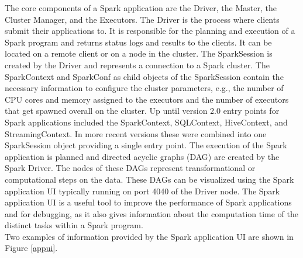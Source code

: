 \noindent The core components of a Spark application are the Driver, the Master, the Cluster Manager, and the Executors. The Driver is the process where clients submit their applications to. It is responsible for the planning and execution of a Spark program and returns status logs and results to the clients. It can be located on a remote client or on a node in the cluster. The SparkSession is created by the Driver and represents a connection to a Spark cluster. The SparkContext and SparkConf as child objects of the SparkSession contain the necessary information to configure the cluster parameters, e.g., the number of CPU cores and memory assigned to the executors and the number of executors that get spawned overall on the cluster. Up until version 2.0 entry points for Spark applications included the SparkContext, SQLContext, HiveContext, and StreamingContext. In more recent versions these were combined into one SparkSession object providing a single entry point.
The execution of the Spark application is planned and directed acyclic graphs (DAG) are created by the Spark Driver. The nodes of these DAGs represent transformational or computational steps on the data. These DAGs can be visualized using the Spark application UI typically running on port 4040 of the Driver node. The Spark application UI is a useful tool to improve the performance of Spark applications and for debugging, as it also gives information about the computation time of the distinct tasks within a Spark program. \cite[pp. 45 ff]{sparkbook1}\\
Two examples of information provided by the Spark application UI are shown in Figure \ref{appui}.\\

